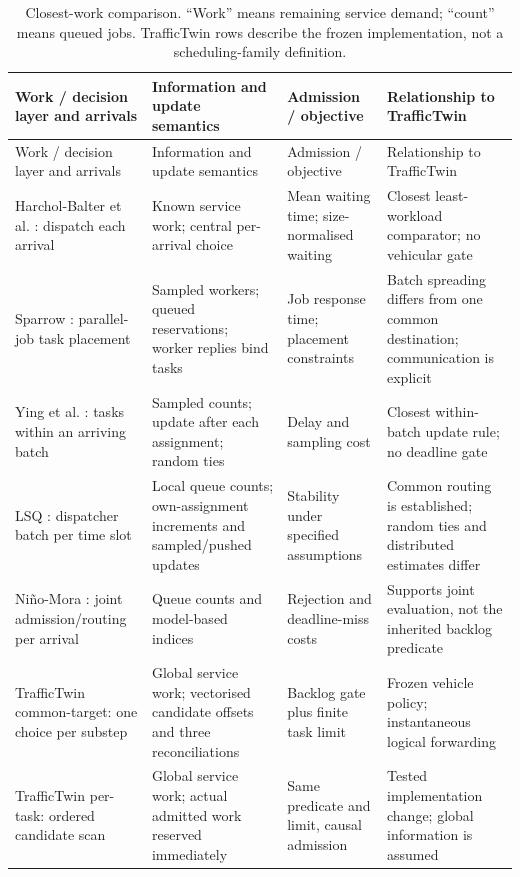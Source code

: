 \documentclass[11pt,a4paper]{article}
\begin{document}
\begingroup
\small
\begin{xltabular}{\textwidth}{@{}YYYY@{}}
\caption{Closest-work comparison. ``Work'' means remaining service demand; ``count'' means queued jobs. TrafficTwin rows describe the frozen implementation, not a scheduling-family definition.}\label{tab:1} \\
\toprule
Work / decision layer and arrivals & Information and update semantics & Admission / objective & Relationship to TrafficTwin \\
\midrule\endfirsthead
\toprule
Work / decision layer and arrivals & Information and update semantics & Admission / objective & Relationship to TrafficTwin \\
\midrule\endhead
\bottomrule\endfoot
Harchol-Balter et al. \cite{ref2}: dispatch each arrival & Known service work; central per-arrival choice & Mean waiting time; size-normalised waiting & Closest least-workload comparator; no vehicular gate \\
Sparrow \cite{ref9}: parallel-job task placement & Sampled workers; queued reservations; worker replies bind tasks & Job response time; placement constraints & Batch spreading differs from one common destination; communication is explicit \\
Ying et al. \cite{ref13}: tasks within an arriving batch & Sampled counts; update after each assignment; random ties & Delay and sampling cost & Closest within-batch update rule; no deadline gate \\
LSQ \cite{ref10}: dispatcher batch per time slot & Local queue counts; own-assignment increments and sampled/pushed updates & Stability under specified assumptions & Common routing is established; random ties and distributed estimates differ \\
Niño-Mora \cite{ref11}: joint admission/routing per arrival & Queue counts and model-based indices & Rejection and deadline-miss costs & Supports joint evaluation, not the inherited backlog predicate \\
TrafficTwin common-target: one choice per substep & Global service work; vectorised candidate offsets and three reconciliations & Backlog gate plus finite task limit & Frozen vehicle policy; instantaneous logical forwarding \\
TrafficTwin per-task: ordered candidate scan & Global service work; actual admitted work reserved immediately & Same predicate and limit, causal admission & Tested implementation change; global information is assumed \\
\end{xltabular}
\endgroup
\end{document}
